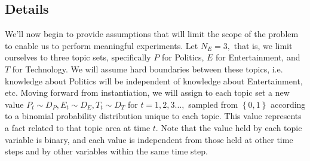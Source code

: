 \documentclass{amsart}
\theoremstyle{definition}
\theoremstyle{plain}
\numberwithin{equation}{section}
\begin{document}

\subsection{Details}

We'll now begin to provide assumptions that will limit the scope of the
problem to enable us to perform meaningful experiments. Let $N_{E}=3,$ that
is, we limit ourselves to three topic sets, specifically $P$ for Politics, $E
$ for Entertainment, and $T$ for Technology. We will assume hard boundaries
between these topics, i.e. knowledge about Politics will be independent of
knowledge about Entertainment, etc. Moving forward from instantiation, we
will assign to each topic set a new value $P_{t}\sim D_{P},E_{t}\sim
D_{E},T_{t}\sim D_{T}$ for $t=1,2,3...,$ sampled from $\left\{ 0,1\right\} $
according to a binomial probability distribution unique to each topic. This
value represents a fact related to that topic area at time $t$. Note that
the value held by each topic variable is binary, and each value is
independent from those held at other time steps and by other variables
within the same time step.  
\end{document}
